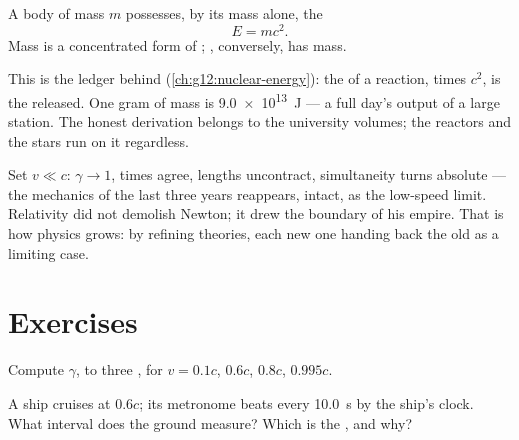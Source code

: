 \begin{theorem}\label{thm:g12:special-relativity:emc2}
A body of mass $m$ possesses, by its mass alone, the 
\[ E = m c^2 . \]
Mass is a concentrated form of ; , conversely, has mass.
\end{theorem}
\admitted

\begin{remark}\label{rem:g12:special-relativity:emc2seen}
This is the ledger behind  (\cref{ch:g12:nuclear-energy}):
the  of a reaction, times $c^2$, is the  released. One
gram of mass is \qty{9.0e13}{J} --- a full day's output of a large 
station. The honest derivation belongs to the university volumes; the
reactors and the stars run on it regardless.
\end{remark}

\begin{remark}\label{rem:g12:special-relativity:newton}
Set $v \ll c$: $\gamma \to 1$, times agree, lengths uncontract,
simultaneity turns absolute --- the mechanics of the last three years
reappears, intact, as the low-speed limit. Relativity did not demolish
Newton; it drew the boundary of his empire. That is how physics grows: by
refining theories, each new one handing back the old as a limiting case.
\end{remark}

\section{Exercises}

\begin{exercise}[$\star$]\label{exo:g12:special-relativity:1}
Compute $\gamma$, to three , for $v = 0.1c$, $0.6c$, $0.8c$, $0.995c$.
\end{exercise}

\begin{exercise}[$\star$]\label{exo:g12:special-relativity:2}
A ship cruises at $0.6c$; its metronome beats every \qty{10.0}{s} by the ship's
clock. What interval does the ground measure? Which is the , and why?
\end{exercise}


